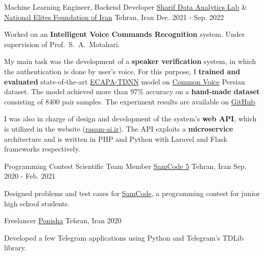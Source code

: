 \begin{cventries}
  \cventry
    {Machine Learning Engineer, Backend Developer} %
    {\href{https://www.sharif.edu/}{Sharif Data Analytics Lab} \& \href{https://en.bmn.ir/}{National Elites Foundation of Iran}} %
    {Tehran, Iran} %
    {Dec. 2021 - Sep. 2022} %
    {
      \begin{cvitems} %
        \item {Worked on an \textbf{Intelligent Voice Commands Recognition} system. Under supervision of Prof.~S.~A.~Motahari.}
        \item {My main task was the development of a \textbf{speaker verification} system, in which the authentication is done by user's voice. For this purpose, I \textbf{trained and evaluated} state-of-the-art \href{https://arxiv.org/abs/2005.07143}{ECAPA-TDNN} model on \href{https://commonvoice.mozilla.org}{Common Voice} Persian dataset. The model achieved more than 97\% accuracy on a \textbf{hand-made dataset} consisting of 8400 pair samples. The experiment results are available on \href{https://github.com/radinshayanfar/speaker-verification}{GitHub}.}
        \item{I was also in charge of design and development of the system's \textbf{web API}, which is utilized in the website (\href{https://rasam-ai.ir/}{rasam-ai.ir}). The API exploits a \textbf{microservice} architecture and is written in PHP and Python with Laravel and Flask frameworks respectively.}
      \end{cvitems}
    }

  \cventry
    {Programming Contest Scientific Team Member} %
    {\href{https://samcode.allamehelli3.ir/staff.html}{SamCode 5}} %
    {Tehran, Iran} %
    {Sep. 2020 - Feb. 2021} %
    {
      \begin{cvitems} %
        \item {Designed problems and test cases for {\href{https://samcode.allamehelli3.ir/}{SamCode}}, a programming contest for junior high school students.}
      \end{cvitems}
    }

  \cventry
    {Freelancer} %
    {\href{https://ponisha.ir/profile/radinshayanfar}{Ponisha}} %
    {Tehran, Iran} %
    {2020} %
    {
      \begin{cvitems} %
        \item {Developed a few Telegram applications using Python and Telegram’s TDLib library.}
      \end{cvitems}
    }

\end{cventries}

